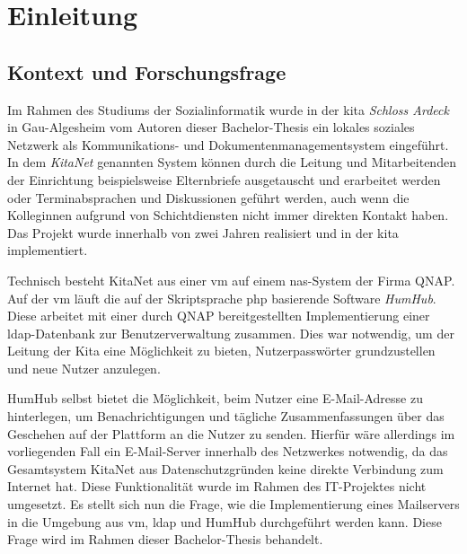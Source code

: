
\setcounter{page}{1}

\chapter{Einleitung}
\label{sec:Einleitung}
\section{Kontext und Forschungsfrage}
\label{sec:Frage}
Im Rahmen des Studiums der Sozialinformatik wurde in der \ac{kita} \textit{Schloss Ardeck} in Gau-Algesheim vom Autoren dieser Bachelor-Thesis ein lokales soziales Netzwerk als Kommunikations- und Dokumentenmanagementsystem eingeführt. 
In dem \textit{KitaNet} genannten System können durch die Leitung und Mitarbeitenden der Einrichtung beispielsweise Elternbriefe ausgetauscht und erarbeitet werden oder Terminabsprachen und Diskussionen geführt werden, auch wenn die Kolleginnen aufgrund von Schichtdiensten nicht immer direkten Kontakt haben. \\ 
Das Projekt wurde innerhalb von zwei Jahren realisiert und in der \ac{kita} implementiert.

Technisch besteht KitaNet aus einer \ac{vm} auf einem \ac{nas}-System der Firma QNAP. 
Auf der \ac{vm} läuft die auf der Skriptsprache \ac{php} basierende Software \textit{HumHub}. 
Diese arbeitet mit einer durch QNAP bereitgestellten Implementierung einer \ac{ldap}-Datenbank zur Benutzerverwaltung zusammen. 
Dies war notwendig, um der Leitung der Kita eine Möglichkeit zu bieten, Nutzerpasswörter grundzustellen und neue Nutzer anzulegen.

HumHub selbst bietet die Möglichkeit, beim Nutzer eine E-Mail-Adresse zu hinterlegen, um Benachrichtigungen und tägliche Zusammenfassungen über das Geschehen auf der Plattform an die Nutzer zu senden.
Hierfür wäre allerdings im vorliegenden Fall ein E-Mail-Server innerhalb des Netzwerkes notwendig, da das Gesamtsystem KitaNet aus Datenschutzgründen keine direkte Verbindung zum Internet hat. 
Diese Funktionalität wurde im Rahmen des IT-Projektes nicht umgesetzt. 
Es stellt sich nun die Frage, wie die Implementierung eines Mailservers in die Umgebung aus \ac{vm}, \ac{ldap} und HumHub durchgeführt werden kann. 
Diese Frage wird im Rahmen dieser Bachelor-Thesis behandelt.


